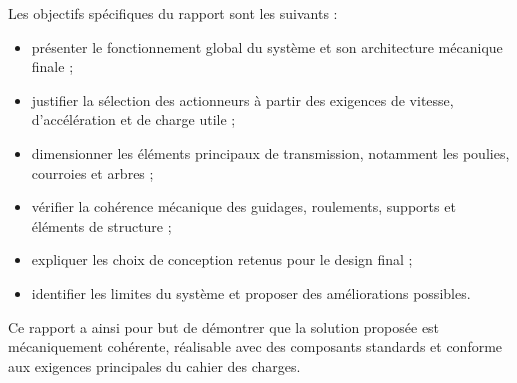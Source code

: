 Les objectifs spécifiques du rapport sont les suivants :
\begin{itemize}
    \item présenter le fonctionnement global du système et son architecture mécanique finale ;
    \item justifier la sélection des actionneurs à partir des exigences de vitesse, d’accélération et de charge utile ;
    \item dimensionner les éléments principaux de transmission, notamment les poulies, courroies et arbres ;
    \item vérifier la cohérence mécanique des guidages, roulements, supports et éléments de structure ;
    \item expliquer les choix de conception retenus pour le design final ;
    \item identifier les limites du système et proposer des améliorations possibles.
\end{itemize}

Ce rapport a ainsi pour but de démontrer que la solution proposée est mécaniquement cohérente, réalisable avec des composants standards et conforme aux exigences principales du cahier des charges.